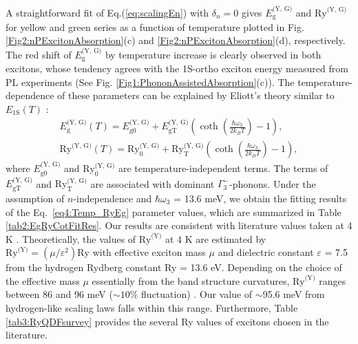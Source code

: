 \documentclass[aps,reprint,amsmath,amssymb,prb]{revtex4-1}
\begin{document}
A straightforward fit of Eq.(\ref{eq:scalingEn}) with $\delta_n = 0$ gives $E_{\text{g}}^{\text{(Y, G)}}$ and $\text{Ry}_{\text{}}^{\text{(Y, G)}}$ for yellow and green series as a function of temperature plotted in Fig. \ref{Fig2:nPExcitonAbsorption}(c) and \ref{Fig2:nPExcitonAbsorption}(d), respectively. The red shift of $E_{\text{g}}^{\text{(Y, G)}}$ by temperature increase is clearly observed in both excitons, whose tendency agrees with the 1S-ortho exciton energy measured from PL experiments (See Fig. \ref{Fig1:PhononAssistedAbsorption}(c)). 
The temperature-dependence of these parameters can be explained by Eliott's theory similar to $E_{\text{1S}}(T) $ \cite{Itoh1975}:
\begin{equation}
\begin{array}{l}
E_\textrm{g}^{\text{(Y, G)}}(T)=E_\textrm{g0}^{\text{(Y, G)}} +
E_\textrm{gT}^{\text{(Y, G)}}\left( \operatorname{coth}\left(\frac{\hbar \omega_3}{2 k_B T}\right)-1\right),\\
\text{Ry}_\textrm{}^{\text{(Y, G)}}(T) = \text{Ry}_\textrm{0}^{\text{(Y, G)}} +
\text{Ry}_\textrm{T}^{\text{(Y, G)}}\left( \operatorname{coth}\left(\frac{\hbar \omega_3}{2 k_B T}\right)-1\right),
\end{array}\label{eq4:Temp_RyEg}
\end{equation}
where $E_\textrm{g0}^{\text{(Y, G)}}$ and $\text{Ry}_\textrm{0}^{\text{(Y, G)}}$ are temperature-independent terms. The terms of $E_\textrm{gT}^{\text{(Y, G)}}$ and $\text{Ry}_\textrm{T}^{\text{(Y, G)}}$ are associated with dominant $\Gamma_3^-$-phonons. Under the assumption of $n$-independence and $\hbar\omega_3$ = 13.6 meV, we obtain the fitting results of the Eq.~\ref{eq4:Temp_RyEg} parameter values, which are summarized in Table \ref{tab2:EgRyCotFitRes}. Our results are consistent with literature values taken at 4 K \cite{Itoh1975,Gross1956}. Theoretically, the values of $\text{Ry}^{\text{(Y)}}$ at 4 K are estimated by $\text{Ry}^{\text{(Y)}} = (\mu/\varepsilon^2) \text{Ry}$ with effective exciton mass $\mu$ and dielectric constant $\varepsilon$ = 7.5 from the hydrogen Rydberg constant Ry = 13.6 eV. Depending on the choice of the effective mass $\mu$ essentially from the band structure curvatures, $\text{Ry}^{\text{(Y)}}$ ranges between 86 and 96 meV ($\sim10 \%$ fluctuation) \cite{Zielinska-Raczynska2016}. Our value of $\sim$95.6 meV from hydrogen-like scaling laws falls within this range. Furthermore, Table \ref{tab3:RyQDFsurvey} provides the several Ry values of  excitons chosen in the literature. 
\end{document}
